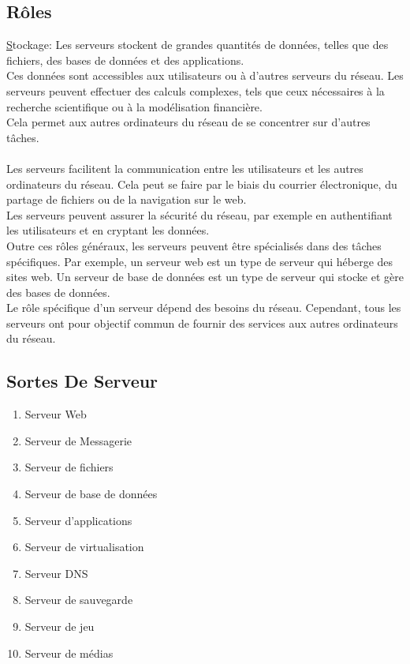  \subsection*{Rôles}
 
  \underline Stockage: Les serveurs stockent de grandes quantités de données, telles que des fichiers, des bases de données et des applications.\\
   Ces données sont accessibles aux utilisateurs ou à d'autres serveurs du réseau.
  Les serveurs peuvent effectuer des calculs complexes, tels que ceux nécessaires à la recherche scientifique ou à la modélisation financière.\\ Cela permet aux autres ordinateurs du réseau de se concentrer sur d'autres tâches.
  \paragraph{ }
   Les serveurs facilitent la communication entre les utilisateurs et les autres ordinateurs du réseau. Cela peut se faire par le biais du courrier électronique, du partage de fichiers ou de la navigation sur le web.\\
 
   Les serveurs peuvent assurer la sécurité du réseau, par exemple en authentifiant les utilisateurs et en cryptant les données.\\
 
 Outre ces rôles généraux, les serveurs peuvent être spécialisés dans des tâches spécifiques. Par exemple, un serveur web est un type de serveur qui héberge des sites web. Un serveur de base de données est un type de serveur qui stocke et gère des bases de données.\\
 
 Le rôle spécifique d'un serveur dépend des besoins du réseau. Cependant, tous les serveurs ont pour objectif commun de fournir des services aux autres ordinateurs du réseau.
 
 \subsection*{ Sortes De Serveur}
\begin{enumerate}
     \item Serveur Web
     \item Serveur de Messagerie
     \item Serveur de fichiers
     \item Serveur de base de données 
     \item Serveur d'applications
     \item Serveur de virtualisation
     \item Serveur DNS
     \item Serveur de sauvegarde 
     \item Serveur de jeu 
     \item Serveur de médias    
\end{enumerate}
 
